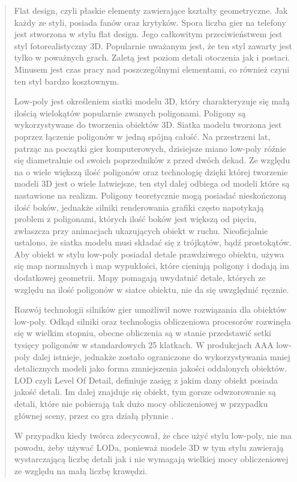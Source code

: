 \begin{quotation}
\indent Flat design, czyli płaskie elementy zawierające kształty geometryczne. Jak każdy ze styli, posiada fanów oraz krytyków. Spora liczba gier na telefony jest stworzona w stylu flat design. Jego całkowitym przeciwieństwem jest styl fotorealistyczny 3D. Popularnie uważanym jest, że ten styl zawarty jest tylko w poważnych grach. Zaletą jest poziom detali otoczenia jak i postaci. Minusem jest czas pracy nad poszczególnymi elementami, co również czyni ten styl bardzo kosztownym.

\indent Low-poly jest określeniem siatki modelu 3D, który charakteryzuje się małą ilością wielokątów popularnie zwanych poligonami. Poligony są wykorzystywane do tworzenia obiektów 3D. Siatka modelu tworzona jest poprzez łączenie poligonów w jedną spójną całość. Na przestrzeni lat, patrząc na początki gier komputerowych, dzisiejsze miano low-poly róźnie się diametralnie od swoich poprzedników z przed dwóch dekad. Ze względu na o wiele większą ilość poligonów oraz technologię dzięki której tworzenie modeli 3D jest o wiele łatwiejsze, ten styl dalej odbiega od modeli które są nastawione na realizm. Poligony teoretycznie mogą posiadać nieskończoną ilość boków, jednakże silniki renderowania grafiki często napotykają problem z poligonami, których ilość boków jest większą od pięciu, zwłaszcza przy animacjach ukazujących obiekt w ruchu. Nieoficjalnie ustalono, że siatka modelu musi składać się z trójkątów, bądź prostokątów. Aby obiekt w stylu low-poly posiadał detale prawdziwego obiektu, używa się map normalnych i map wypukłości, które cieniują poligony i dodają im dodatkowej geometrii. Mapy pomagają uwydatnić detale, których ze względu na ilość poligonów w siatce obiektu, nie da się uwzględnić ręcznie.

\indent Rozwój technologii silników gier umożliwił nowe rozwiązania dla obiektów low-poly. Odkąd silniki oraz technologia obliczeniowa procesorów rozwinęła się w wielkim stopniu, obecne obliczenia są w stanie przedstawić setki tysięcy poligonów w standardowych 25 klatkach. 
W produkcjach AAA low-poly dalej istnieje, jednakże zostało ograniczone do wykorzystywania mniej detalicznych modeli jako forma zmniejszenia jakości oddalonych obiektów. LOD czyli Level Of Detail, definiuje zasięg z jakim dany obiekt posiada jakość detali. Im dalej znajduje się obiekt, tym gorsze odwzorowanie są detali, które nie pobierają tak dużo mocy obliczeniowej w przypadku głównej sceny, przez co gra działą płynnie \cite{1}.

\indent W przypadku kiedy twórca zdecycował, że chce użyć stylu low-poly, nie ma powodu, żeby używać LODa, ponieważ modele 3D w tym stylu zawierają wystarczającą liczbę detali jak i nie wymagają wielkiej mocy obliczeniowej ze względu na małą liczbę krawędzi.


\end{quotation}
